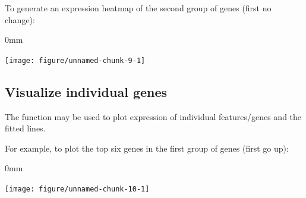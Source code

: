 \documentclass{article}\usepackage[]{graphicx}\usepackage[usenames,dvipsnames]{color}
\newcommand{\hlnum}[1]{\textcolor[rgb]{0.816,0.125,0.439}{#1}}%
\newcommand{\hlstr}[1]{\textcolor[rgb]{0.251,0.627,0.251}{#1}}%
\newcommand{\hlopt}[1]{\textcolor[rgb]{0,0,0}{#1}}%
\newcommand{\hlstd}[1]{\textcolor[rgb]{0.251,0.251,0.251}{#1}}%
\newcommand{\hlkwb}[1]{\textcolor[rgb]{0,0,0}{#1}}%
\newcommand{\hlkwc}[1]{\textcolor[rgb]{0.251,0.251,0.251}{#1}}%
\newcommand{\hlkwd}[1]{\textcolor[rgb]{0.878,0.439,0.125}{#1}}%
\newenvironment{knitrout}{}{} %
\begin{document}
To generate an expression heatmap of the second group of genes (first no change):
\begin{knitrout}
\color{fgcolor}\begin{adjustwidth}{\fltoffset}{0mm}

{\centering \texttt{[image: figure/unnamed-chunk-9-1]} 

}

\end{adjustwidth}
\end{knitrout}


\subsection{Visualize individual genes}
The  function may be used to plot expression of individual features/genes and the fitted lines.

For example, to plot the top six genes in the first group of genes (first go up):

\begin{knitrout}
\color{fgcolor}\begin{adjustwidth}{\fltoffset}{0mm}

{\centering \texttt{[image: figure/unnamed-chunk-10-1]} 

}

\end{adjustwidth}
\end{knitrout}
\end{document}

